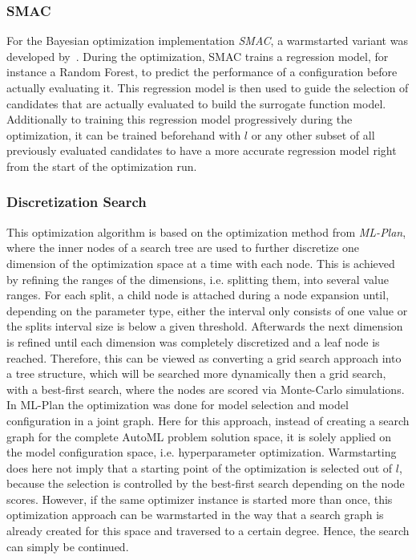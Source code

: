 \subsubsection{SMAC}
For the Bayesian optimization implementation \textit{SMAC}, a warmstarted variant was developed by~\textcite{Lindauer-Smac-Warmstart}.
During the optimization, SMAC trains a regression model, for instance a Random Forest, to predict the performance of a configuration before actually evaluating it.
This regression model is then used to guide the selection of candidates that are actually evaluated to build the surrogate function model.
Additionally to training this regression model progressively during the optimization, it can be trained beforehand with $l$ or any other subset of all previously evaluated candidates to have a more accurate regression model right from the start of the optimization run.

\subsubsection{Discretization Search}
This optimization algorithm is based on the optimization method from \textit{ML-Plan}, where the inner nodes of a search tree are used to further discretize one dimension of the optimization space at a time with each node.
This is achieved by refining the ranges of the dimensions, i.e. splitting them, into several value ranges.
For each split, a child node is attached during a node expansion until, depending on the parameter type, either the interval only consists of one value or the splits interval size is below a given threshold.
Afterwards the next dimension is refined until each dimension was completely discretized and a leaf node is reached.\newline
Therefore, this can be viewed as converting a grid search approach into a tree structure, which will be searched more dynamically then a grid search, with a best-first search, where the nodes are scored via Monte-Carlo simulations.\newline 
In ML-Plan the optimization was done for model selection and model configuration in a joint graph.
Here for this approach, instead of creating a search graph for the complete AutoML problem solution space, it is solely applied on the model configuration space, i.e. hyperparameter optimization.\newline
Warmstarting does here not imply that a starting point of the optimization is selected out of $l$, because the selection is controlled by the best-first search depending on the node scores.
However, if the same optimizer instance is started more than once, this optimization approach can be warmstarted in the way that a search graph is already created for this space and traversed to a certain degree.
Hence, the search can simply be continued.
